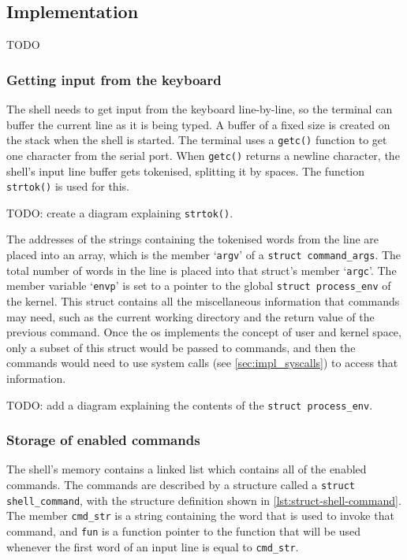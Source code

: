 \documentclass{article}
\begin{document}
\subsection{Implementation}
TODO

\subsubsection{Getting input from the keyboard}
The shell needs to get input from the keyboard line-by-line, so the terminal
can buffer the current line as it is being typed. A buffer of a fixed size is
created on the stack when the shell is started. The terminal uses a
\texttt{getc()} function to get one character from the serial port. When
\texttt{getc()} returns a newline character, the shell's input line buffer gets
tokenised, splitting it by spaces. The function \texttt{strtok()} is used for
this.

TODO: create a diagram explaining \texttt{strtok()}.

The addresses of the strings containing the tokenised words from the line are
placed into an array, which is the member `\texttt{argv}' of a \texttt{struct
command\_args}. The total number of words in the line is placed into that
struct's member `\texttt{argc}'. The member variable `\texttt{envp}' is set to
a pointer to the global \texttt{struct process\_env} of the kernel. This struct
contains all the miscellaneous information that commands may need, such as the
current working directory and the return value of the previous command. Once
the \gls{os} implements the concept of user and kernel space, only a subset of
this struct would be passed to commands, and then the commands would need to
use system calls (see \autoref{sec:impl_syscalls}) to access that information.

TODO: add a diagram explaining the contents of the \texttt{struct
process\_env}.

\subsubsection{Storage of enabled commands}
The shell's memory contains a linked list which contains all of the enabled
commands. The commands are described by a structure called a \texttt{struct
shell\_command}, with the structure definition shown in
\autoref{lst:struct-shell-command}. The member \verb!cmd_str! is a string
containing the word that is used to invoke that command, and \verb!fun! is a
function pointer to the function that will be used whenever the first word of
an input line is equal to \verb!cmd_str!.
\end{document}
